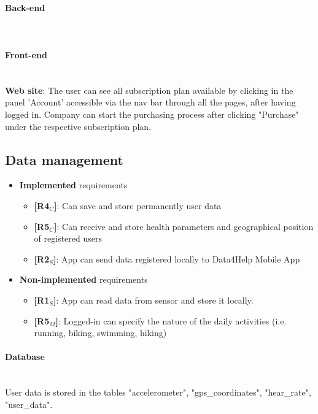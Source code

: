 \paragraph{Back-end} \mbox{}\\  
\paragraph{Front-end} \mbox{}\\
\textbf{Web site}: The user can see all subscription plan available by clicking in the panel 'Account' accessible via the nav bar through all the pages, after having logged in.
Company can start the purchasing process after clicking "Purchase" under the respective subscription plan.



\subsection{Data management}
\begin{itemize}
    \item \textbf{Implemented} requirements
        \begin{itemize}
    
        \item \textbf{[R4$_C$]}: Can save and store permanently user data
    \item \textbf{[R5$_C$]}: Can receive and store health parameters and geographical position of registered users
     \item \textbf{[R2$_S$]}: App can send data registered locally to Data4Help Mobile App

        \end{itemize}
    \item \textbf{Non-implemented} requirements
    \begin{itemize}
    \item \textbf{[R1$_S$]}: App can read data from sensor and store it locally.
     
      \item \textbf{[R5$_M$]}: Logged-in can specify the nature of the daily activities (i.e. running, biking, swimming, hiking)

        \end{itemize}
\end{itemize}

\paragraph{Database} \mbox{}\\  
User data is stored in the tables "accelerometer", "gps\_coordinates", "hear\_rate", "user\_data".


